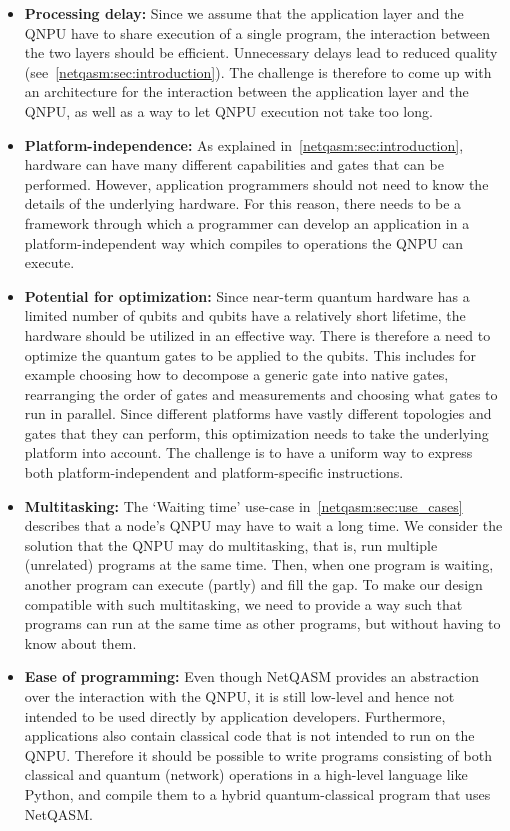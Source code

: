 \begin{itemize}
      \item \textbf{Processing delay:}
            Since we assume that the application layer and the \ac{QNPU} have to share execution of a single program, the interaction between the two layers should be efficient.
            Unnecessary delays lead to reduced quality (see~\cref{netqasm:sec:introduction}).
            The challenge is therefore to come up with an architecture for the interaction between the application layer and the \ac{QNPU}, as well as a way to let \ac{QNPU} execution not take too long.
      \item \textbf{Platform-independence:}
            As explained in~\cref{netqasm:sec:introduction}, hardware can have many different capabilities and gates that can be performed.
            However, application programmers should not need to know the details of the underlying hardware.
            For this reason, there needs to be a framework through which a programmer can develop an application in a platform-independent way which compiles to operations the \ac{QNPU} can execute.
      \item \textbf{Potential for optimization:}
            Since near-term quantum hardware has a limited number of qubits and qubits have a relatively short lifetime, the hardware should be utilized in an effective way.
            There is therefore a need to optimize the quantum gates to be applied to the qubits.
            This includes for example choosing how to decompose a generic gate into native gates, rearranging the order of gates and measurements and choosing what gates to run in parallel.
            Since different platforms have vastly different topologies and gates that they can perform, this optimization needs to take the underlying platform into account.
            The challenge is to have a uniform way to express both platform-independent and platform-specific instructions.
      \item \textbf{Multitasking:}
            The `Waiting time' use-case in~\cref{netqasm:sec:use_cases} describes that a node's \ac{QNPU} may have to wait a long time. We consider the solution that the \ac{QNPU} may do multitasking, that is, run multiple (unrelated) programs at the same time.
            Then, when one program is waiting, another program can execute (partly) and fill the gap.
            To make our design compatible with such multitasking, we need to provide a way such that programs can run at the same time as other programs, but without having to know about them.
      \item \textbf{Ease of programming:}
            Even though \ac{NetQASM} provides an abstraction over the interaction with the \ac{QNPU}, it is still low-level and hence not intended to be used directly by application developers.
            Furthermore, applications also contain classical code that is not intended to run on the \ac{QNPU}.
            Therefore it should be possible to write programs consisting of both classical and quantum (network) operations in a high-level language like Python, and compile them to a hybrid quantum-classical program that uses \ac{NetQASM}.

\end{itemize}